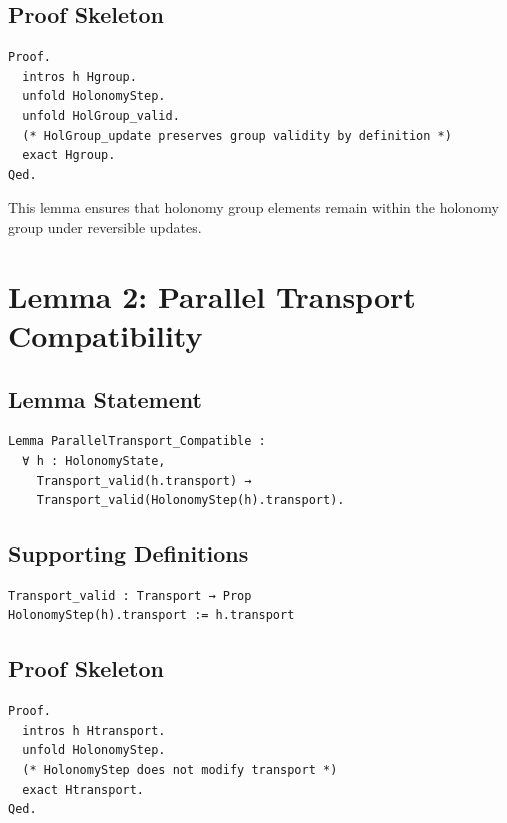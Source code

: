\documentclass[11pt]{article}
\begin{document}
\subsection{Proof Skeleton}

\begin{verbatim}
Proof.
  intros h Hgroup.
  unfold HolonomyStep.
  unfold HolGroup_valid.
  (* HolGroup_update preserves group validity by definition *)
  exact Hgroup.
Qed.
\end{verbatim}

This lemma ensures that holonomy group elements remain within the holonomy group
under reversible updates.

\newpage


\section{Lemma 2: Parallel Transport Compatibility}

\subsection{Lemma Statement}

\begin{verbatim}
Lemma ParallelTransport_Compatible :
  ∀ h : HolonomyState,
    Transport_valid(h.transport) →
    Transport_valid(HolonomyStep(h).transport).
\end{verbatim}

\subsection{Supporting Definitions}

\begin{verbatim}
Transport_valid : Transport → Prop
HolonomyStep(h).transport := h.transport
\end{verbatim}

\subsection{Proof Skeleton}

\begin{verbatim}
Proof.
  intros h Htransport.
  unfold HolonomyStep.
  (* HolonomyStep does not modify transport *)
  exact Htransport.
Qed.
\end{verbatim}
\end{document}
